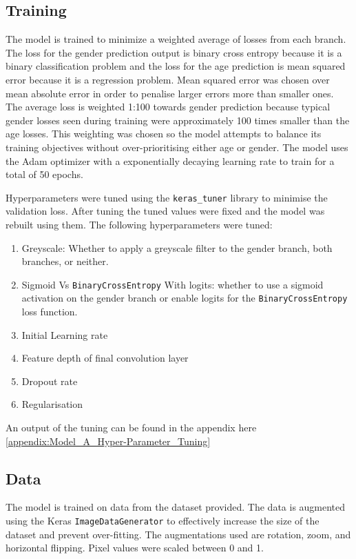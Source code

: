 \subsection{Training}
The model is trained to minimize a weighted average of losses from each branch. 
The loss for the gender prediction output is binary cross entropy because it is a binary classification problem and the loss for the age prediction is mean squared error because it is a regression problem. 
Mean squared error was chosen over mean absolute error in order to penalise larger errors more than smaller ones. 
The average loss is weighted 1:100 towards gender prediction because typical gender losses seen during training were approximately 100 times smaller than the age losses.
This weighting was chosen so the model attempts to balance its training objectives without over-prioritising either age or gender. 
The model uses the Adam optimizer with a exponentially decaying learning rate to train for a total of 50 epochs. 

Hyperparameters were tuned using the \verb|keras_tuner| library to minimise the validation loss. After tuning the tuned values were fixed and the model was rebuilt using them. The following hyperparameters were tuned:
\begin{enumerate}
    \item Greyscale: Whether to apply a greyscale filter to the gender branch, both branches, or neither.
    \item Sigmoid Vs \verb|BinaryCrossEntropy| With logits: whether to use a sigmoid activation on the gender branch or enable logits for the \verb|BinaryCrossEntropy| loss function.
    \item Initial Learning rate
    \item Feature depth of final convolution layer
    \item Dropout rate 
    \item Regularisation
\end{enumerate}

An output of the tuning can be found in the appendix here \autoref{appendix:Model_A_Hyper-Parameter_Tuning}


\subsection{Data}
The model is trained on data from the dataset provided. The data is augmented using the Keras \verb|ImageDataGenerator| to effectively increase the size of the dataset and prevent over-fitting. 
The augmentations used are rotation, zoom, and horizontal flipping. Pixel values were scaled between 0 and 1.

